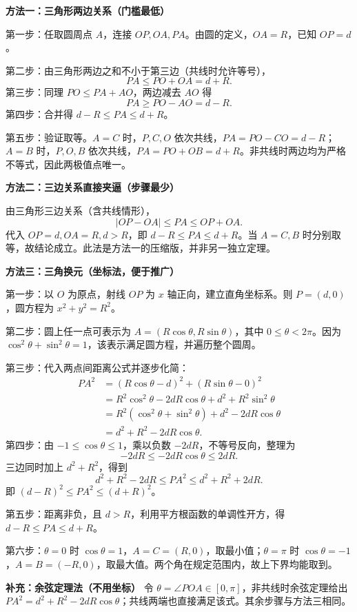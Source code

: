 \begin{proofbox}
\textbf{方法一：三角形两边关系（门槛最低）}

第一步：任取圆周点 $A$，连接 $OP,OA,PA$。由圆的定义，$OA=R$，已知 $OP=d$。\begin{center}

\end{center}
第二步：由三角形两边之和不小于第三边（共线时允许等号），
\[PA\leqslant PO+OA=d+R.\]
第三步：同理 $PO\leqslant PA+AO$，两边减去 $AO$ 得
\[PA\geqslant PO-AO=d-R.\]
第四步：合并得 $d-R\leqslant PA\leqslant d+R$。

第五步：验证取等。$A=C$ 时，$P,C,O$ 依次共线，$PA=PO-CO=d-R$；$A=B$ 时，$P,O,B$ 依次共线，$PA=PO+OB=d+R$。非共线时两边均为严格不等式，因此两极值点唯一。\begin{center}

\end{center}
\begin{center}

\end{center}

\textbf{方法二：三边关系直接夹逼（步骤最少）}

由三角形三边关系（含共线情形），
\[|OP-OA|\leqslant PA\leqslant OP+OA.\]
代入 $OP=d,OA=R,d>R$，即 $d-R\leqslant PA\leqslant d+R$。当 $A=C,B$ 时分别取等，故结论成立。此法是方法一的压缩版，并非另一独立定理。\begin{center}

\end{center}

\textbf{方法三：三角换元（坐标法，便于推广）}

第一步：以 $O$ 为原点，射线 $OP$ 为 $x$ 轴正向，建立直角坐标系。则 $P=(d,0)$，圆方程为 $x^2+y^2=R^2$。

第二步：圆上任一点可表示为 $A=(R\cos\theta,R\sin\theta)$，其中 $0\leqslant\theta<2\pi$。因为 $\cos^2\theta+\sin^2\theta=1$，该表示满足圆方程，并遍历整个圆周。\begin{center}

\end{center}
第三步：代入两点间距离公式并逐步化简：
\begin{align*}
PA^2&=(R\cos\theta-d)^2+(R\sin\theta-0)^2\\
&=R^2\cos^2\theta-2dR\cos\theta+d^2+R^2\sin^2\theta\\
&=R^2(\cos^2\theta+\sin^2\theta)+d^2-2dR\cos\theta\\
&=d^2+R^2-2dR\cos\theta.
\end{align*}
第四步：由 $-1\leqslant\cos\theta\leqslant1$，乘以负数 $-2dR$，不等号反向，整理为
\[-2dR\leqslant-2dR\cos\theta\leqslant2dR.\]
三边同时加上 $d^2+R^2$，得到
\[d^2+R^2-2dR\leqslant PA^2\leqslant d^2+R^2+2dR.\]
即 $(d-R)^2\leqslant PA^2\leqslant(d+R)^2$。

第五步：距离非负，且 $d>R$，利用平方根函数的单调性开方，得 $d-R\leqslant PA\leqslant d+R$。

第六步：$\theta=0$ 时 $\cos\theta=1$，$A=C=(R,0)$，取最小值；$\theta=\pi$ 时 $\cos\theta=-1$，$A=B=(-R,0)$，取最大值。两个角在规定范围内，故上下界均能取到。

\textbf{补充：余弦定理法（不用坐标）}
令 $\theta=\angle POA\in[0,\pi]$，非共线时余弦定理给出 $PA^2=d^2+R^2-2dR\cos\theta$；共线两端也直接满足该式。其余步骤与方法三相同。
\end{proofbox}
